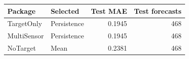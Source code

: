 \begin{tabular}{llrr}
\toprule
Package & Selected & Test MAE & Test forecasts \\
\midrule
TargetOnly & Persistence & 0.1945 & 468 \\
MultiSensor & Persistence & 0.1945 & 468 \\
NoTarget & Mean & 0.2381 & 468 \\
\bottomrule
\end{tabular}